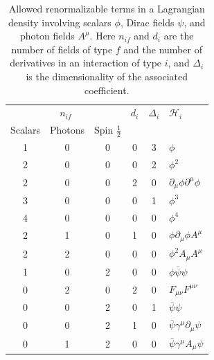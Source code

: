 \begingroup
\renewcommand{\thetable}{12.\arabic{table}}
\setcounter{table}{1}
\begin{table}[t]
\centering
\caption{Allowed renormalizable terms in a Lagrangian density involving
scalars $\phi$, Dirac fields $\psi$, and photon fields $A^\mu$. Here $n_{if}$
and $d_i$ are the number of fields of type $f$ and the number of derivatives
in an interaction of type $i$, and $\Delta_i$ is the dimensionality of the
associated coefficient.}
\label{tab:weinberg-12-2}
\renewcommand{\arraystretch}{1.15}
\setlength{\tabcolsep}{1.25em}
\begin{tabular}{ccc c c l}
\hline\hline
\multicolumn{3}{c}{$n_{if}$} & $d_i$ & $\Delta_i$ & $\mathcal H_i$ \\
Scalars & Photons & Spin $\tfrac12$ & & & \\
\hline
1 & 0 & 0 & 0 & 3 & $\phi$ \\
2 & 0 & 0 & 0 & 2 & $\phi^2$ \\
2 & 0 & 0 & 2 & 0 & $\partial_\mu\phi\partial^\mu\phi$ \\
3 & 0 & 0 & 0 & 1 & $\phi^3$ \\
4 & 0 & 0 & 0 & 0 & $\phi^4$ \\
2 & 1 & 0 & 1 & 0 & $\phi\partial_\mu\phi A^\mu$ \\
2 & 2 & 0 & 0 & 0 & $\phi^2 A_\mu A^\mu$ \\
1 & 0 & 2 & 0 & 0 & $\phi\bar\psi\psi$ \\
0 & 2 & 0 & 2 & 0 & $F_{\mu\nu}F^{\mu\nu}$ \\
0 & 0 & 2 & 0 & 1 & $\bar\psi\psi$ \\
0 & 0 & 2 & 1 & 0 & $\bar\psi\gamma^\mu\partial_\mu\psi$ \\
0 & 1 & 2 & 0 & 0 & $\bar\psi\gamma^\mu A_\mu\psi$ \\
\hline\hline
\end{tabular}
\end{table}
\endgroup

